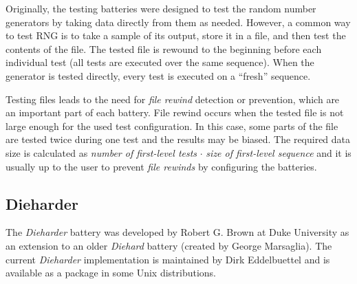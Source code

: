 \documentclass[
  digital,     %
  oneside,     %
  nosansbold,  %
  nocolorbold, %
  nolof,         %
  nolot,         %
]{fithesis4}
\begin{document}
Originally, the testing batteries were designed to test the random number generators by taking data directly from them as needed. However, a common way to test RNG is to take a sample of its output, store it in a file, and then test the contents of the file. The tested file is rewound to the beginning before each individual test (all tests are executed over the same sequence). When the generator is tested directly, every test is executed on a ``fresh'' sequence. 

Testing files leads to the need for \emph{file rewind} detection or prevention, which are an important part of each battery. File rewind occurs when the tested file is not large enough for the used test configuration. In this case, some parts of the file are tested twice during one test and the results may be biased. The required data size is calculated as \emph{number of first-level tests} $\cdot$ \emph{size of first-level sequence} and it is usually up to the user to prevent \emph{file rewinds} by configuring the batteries.


\subsection{Dieharder} \label{chap:sols-dieharder}
The \emph{Dieharder} battery \cite{dieharder_orig} was developed by Robert G. Brown at Duke University as an extension to an older \emph{Diehard} battery (created by George Marsaglia). The current \emph{Dieharder} implementation \cite{dieharder-git} is maintained by Dirk Eddelbuettel and is available as a package in some Unix distributions.
\end{document}

